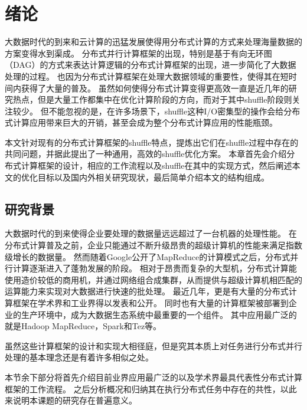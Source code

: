 
\chapter{绪论}
\label{chap:intro}

大数据时代的到来和云计算的迅猛发展使得用分布式计算的方式来处理海量数据的方案变得水到渠成。
分布式并行计算框架的出现，特别是基于有向无环图（DAG）的方式来表达计算逻辑的分布式计算框架的出现，进一步简化了大数据处理的过程。
也因为分布式计算框架在处理大数据领域的重要性，使得其在短时间内获得了大量的普及。
虽然如何使得分布式计算变得更高效一直是近几年的研究热点，但是大量工作都集中在优化计算阶段的方向，而对于其中shuffle阶段则关注较少。
但不能忽视的是，在许多场景下，shuffle这种I/O密集型的操作会给分布式计算应用带来巨大的开销，甚至会成为整个分布式计算应用的性能瓶颈。

本文针对现有的分布式计算框架的shuffle特点，提炼出它们在shuffle过程中存在的共同问题，并据此提出了一种通用，高效的shuffle优化方案。
本章首先会介绍分布式计算框架的设计，相应的工作流程以及shuffle在其中的实现方式，然后阐述本文的优化目标以及国内外相关研究现状，最后简单介绍本文的结构组成。

\section{研究背景}

大数据时代的到来使得企业要处理的数据量远远超过了一台机器的处理性能。
在分布式计算普及之前，企业只能通过不断升级昂贵的超级计算机的性能来满足指数级增长的数据量。
然而随着Google公开了MapReduce\cite{mapreduce}的计算模式之后，分布式并行计算逐渐进入了蓬勃发展的阶段。
相对于昂贵而复杂的大型机，分布式计算能使用造价较低的商用机，并通过网络组合成集群，从而提供与超级计算机相匹配的运算能力来实现对大数据进行快速的批处理。
最近几年，更是有大量的分布式计算框架在学术界和工业界得以发表和公开。
同时也有大量的计算框架被部署到企业的生产环境中，成为大数据生态系统中最重要的一个组件。
其中应用最广泛的就是Hadoop MapReduce\cite{hadoop}，Spark\cite{apachespark}和Tez\cite{tez}等。

虽然这些计算框架的设计和实现大相径庭，但是究其本质上对任务进行分布式并行处理的基本理念还是有着许多相似之处。

本节余下部分将首先介绍目前业界应用最广泛的以及学术界最具代表性分布式计算框架的工作流程。
之后分析概况和归纳其在执行分布式任务中存在的共性，以此来说明本课题的研究存在普遍意义。

